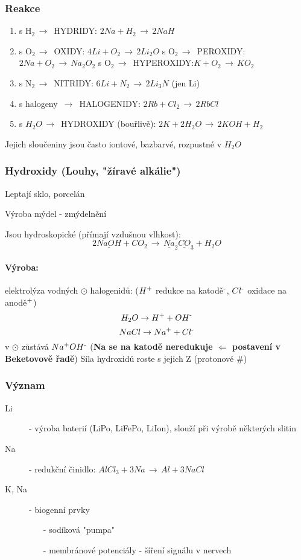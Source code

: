 \documentclass{article}
\def\SP#1{\textsuperscript{#1}}
\def\WATER{H_2O}
\begin{document}
    \subsubsection{Reakce}
    \begin{enumerate}
        \item s H$_2\,\to\,$ HYDRIDY: \tab $2Na + H_2\,\to\, 2NaH$
        \item s O$_2\,\to\,$ OXIDY: \tab $4Li + O_2\,\to\, 2Li_2O$
            \newline s O$_2\,\to\,$ PEROXIDY:\tab $2Na + O_2\,\to\, Na_2O_2$
            \newline s O$_2\,\to\,$ HYPEROXIDY:\tab $K + O_2\,\to\, KO_2$
        \item s N$_2\,\to\,$ NITRIDY: \tab $6Li + N_2\,\to\, 2Li_3N$ (jen Li)
        \item s halogeny $\,\to\,$ HALOGENIDY: \tab $2Rb + Cl_2\,\to\, 2RbCl$
        \item s $\WATER \,\to\,$ HYDROXIDY (bouřlivě): \tab $2K + 2\WATER \,\to\, 2KOH + H_2$
    \end{enumerate}
    Jejich sloučeniny jsou často iontové, bazbarvé, rozpustné v $\WATER$

    \newpage
    \subsubsection{Hydroxidy (Louhy, "žíravé alkálie")}
        Leptají sklo, porcelán

        Výroba mýdel - zmýdelnění

        Jsou hydroskopické (přímají vzdušnou vlhkost):\[2\underline{NaOH} + CO_2\,\to\,\underline{Na}_2\underline{CO}_3 + \WATER \]
        \paragraph*{Výroba:}
            elektrolýza vodných $\odot$ halogenidů: ($H\SP{+}$ redukce na katodě$\SP{-}$, $Cl\SP{-}$ oxidace na anodě$\SP{+}$)
            \[\WATER \to H \SP{+} + OH\SP{-}\]
            \[NaCl \to Na\SP{+} + Cl\SP{-}\]
            v $\odot$ zůstává $Na\SP{+}OH\SP{-}$ (\textbf{Na se na katodě neredukuje $\Longleftarrow $ postavení v Beketovově řadě})
            Síla hydroxidů roste s jejich Z (protonové \#)
    \subsubsection{Význam}
        \begin{description}
            \item[Li] - výroba baterií (LiPo, LiFePo, LiIon), slouží při výrobě některých slitin
            \item[Na] - redukční činidlo: \(AlCl_3 + 3Na\,\to\,Al+3NaCl\)
            \item[K, Na] - biogenní prvky \begin{itemize}
                \item[-] sodíková "pumpa"
                \item[-] membránové potenciály - šíření signálu v nervech
            \end{itemize}
        \end{description}
\end{document}
